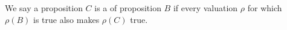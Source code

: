 \begin{node}[Definition]\label{prop-0005}%
We say a proposition $C$ is a  of
proposition $B$ if every valuation $\rho$ for which $\rho(B)$ is true
also makes $\rho(C)$ true.
\end{node}